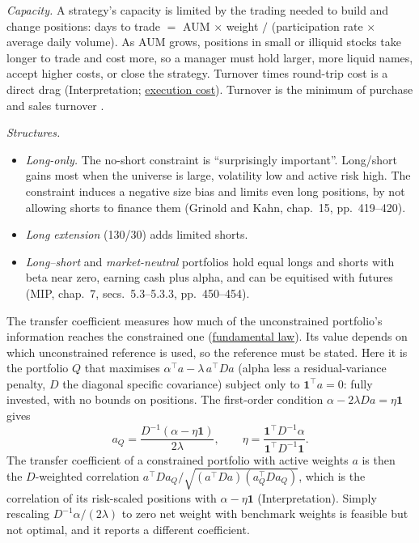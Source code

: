 \begin{qfmethod}\label{meth:equity-portfolio-capacity-structure}
 \emph{Capacity.} A strategy's capacity is limited by the trading needed to build and change positions: days to trade $=$ AUM $\times$ weight $/$ (participation rate $\times$ average daily volume). As AUM grows, positions in small or illiquid stocks take longer to trade and cost more, so a manager must hold larger, more liquid names, accept higher costs, or close the strategy. Turnover times round-trip cost is a direct drag (Interpretation; \hyperref[mod:almgren-chriss-execution]{execution cost}). Turnover is the minimum of purchase and sales turnover \citep[chap.~16, p.~456]{alpha-grinold}.

\emph{Structures.}
\begin{itemize}
\item \emph{Long-only.} The no-short constraint is ``surprisingly important''. Long/short gains most when the universe is large, volatility low and active risk high. The constraint induces a negative size bias and limits even long positions, by not allowing shorts to finance them (Grinold and Kahn, chap.~15, pp.~419--420).
\item \emph{Long extension} (130/30) adds limited shorts.
\item \emph{Long--short} and \emph{market-neutral} portfolios hold equal longs and shorts with beta near zero, earning cash plus alpha, and can be equitised with futures (MIP, chap.~7, secs.~5.3--5.3.3, pp.~450--454).
\end{itemize}
The transfer coefficient measures how much of the unconstrained portfolio's information reaches the constrained one (\hyperref[res:fundamental-law-active-management]{fundamental law}). Its value depends on which unconstrained reference is used, so the reference must be stated. Here it is the portfolio $Q$ that maximises $\alpha^\top a-\lambda\,a^\top Da$ (alpha less a residual-variance penalty, $D$ the diagonal specific covariance) subject only to $\mathbf1^\top a=0$: fully invested, with no bounds on positions. The first-order condition $\alpha-2\lambda Da=\eta\mathbf1$ gives
\[
a_Q=\frac{D^{-1}(\alpha-\eta\mathbf1)}{2\lambda},\qquad \eta=\frac{\mathbf1^\top D^{-1}\alpha}{\mathbf1^\top D^{-1}\mathbf1}.
\]
The transfer coefficient of a constrained portfolio with active weights $a$ is then the $D$-weighted correlation $a^\top Da_Q/\sqrt{(a^\top Da)(a_Q^\top Da_Q)}$, which is the correlation of its risk-scaled positions with $\alpha-\eta\mathbf1$ (Interpretation). Simply rescaling $D^{-1}\alpha/(2\lambda)$ to zero net weight with benchmark weights is feasible but not optimal, and it reports a different coefficient.


\end{qfmethod}
